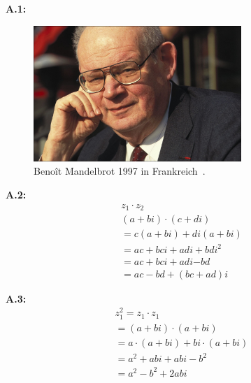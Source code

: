 \newcommand{\figuretag}[1]{%
  \addtocounter{figure}{-1}%
  \renewcommand{\thefigure}{#1}%
}

\noindent\textbf{A.1:}\label{app:1}
\begin{figure}[H]\figuretag{A.1}
\centering
\includegraphics[width=0.7\textwidth]{images/benoit-mandelbrot}
\caption{Benoît Mandelbrot 1997 in Frankreich~\cite{gaillarde_benoit_1997}.}
\label{fig:benoit-mandelbrot-picture}
\end{figure}

\noindent\textbf{A.2:}\label{app:2}
\begin{equation}\tag{A.2}\label{eq:complex-numbers-multiplication}
  \begin{split}
    z_1 \cdot z_2 \\
    (a + bi) \cdot (c + di) \\
    =  c(a + bi) + di(a + bi) \\
    = ac + bci + adi + bdi^2 \\
    = ac + bci + adi \boldsymbol{ - } bd \\
    = ac - bd +(bc + ad)i
  \end{split}
\end{equation}

\noindent\textbf{A.3:}\label{app:3}
\begin{equation}\tag{A.3}\label{eq:complex-numbes-squaring}
  \begin{split}
    z_1^2
    = z_1 \cdot z_1 \\
    = (a + bi) \cdot (a + bi) \\
    = a \cdot (a + bi) + bi \cdot (a + bi) \\
    = a^2 + abi + abi - b^2 \\
    = a^2 - b^2 + 2abi
  \end{split}
\end{equation}


